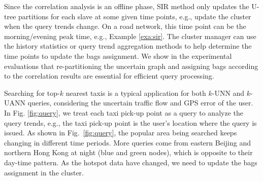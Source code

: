 Since the correlation analysis is an offline phase, SIR method only updates the U-tree partitions for each slave at some given time points, e.g., update the cluster when the query trends change. On a road network, this time point can be the morning/evening peak time, e.g., Example \ref{exa:sir}. The cluster manager can use the history statistics or query trend aggregation methods \cite{poppe2017greta} to help determine the time points to update the bags assignment.
We show in the experimental evaluations that re-partitioning the uncertain graph and assigning bags according to the correlation results are essential for efficient query processing.

\begin{exa}
	Searching for top-$k$ nearest taxis is a typical application for both $k$-UNN and $k$-UANN queries, considering the uncertain traffic flow and GPS error of the user. In Fig. \ref{fig:query}, we treat each taxi pick-up point as a query to analyze the query trends, e.g., the taxi pick-up point is the user's location where the query is issued. 
	As shown in Fig.~\ref{fig:query}, the popular area being searched keeps changing in different time periods. 
	More queries come from eastern Beijing and northern Hong Kong at night (blue and green nodes), which is opposite to their day-time pattern. 
	As the hotspot data have changed, we need to update the bags assignment in the cluster. 
	\label{exa:sir}
\end{exa}